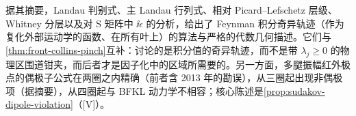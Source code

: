 \begin{remark}\label{rem:front-landau-algebraic}
据其摘要，Landau 判别式\cite{Mizera:2021icv}、主 Landau 行列式\cite{Fevola:2023kaw,Fevola:2023fzn}、相对 Picard--Lefschetz 层级\cite{Berghoff:2022mqu}、Whitney 分层\cite{Helmer:2024wax}以及对 S 矩阵中 $\ii\epsilon$ 的分析\cite{Hannesdottir:2022bmo}，给出了 Feynman 积分奇异轨迹（作为复化外部运动学的函数、在所有叶上）的算法与严格的代数几何描述。它们与\cref{thm:front-collins-pinch}互补：讨论的是积分值的奇异轨迹，而不是带 $\lambda_j\ge0$ 的物理区围道钳夹，而后者才是因子化中的区域所需要的。另一方面，多腿振幅红外极点的偶极子公式在两圈之内精确\cite{Becher:2009cu,Gardi:2009qi}（前者含 2013 年的勘误），从三圈起出现非偶极项\cite{Almelid:2015jia}（据摘要），从四圈起与 BFKL 动力学不相容\cite[第~4~节]{Caron-Huot:2013fea}；核心陈述是\cref{prop:sudakov-dipole-violation}（[V]）。
\end{remark}

